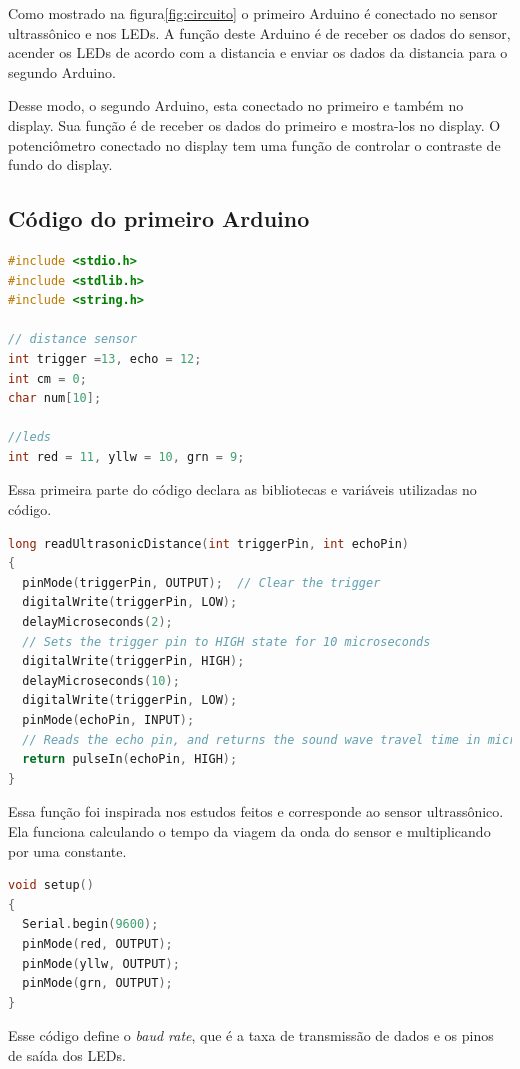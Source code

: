 \documentclass[conference]{IEEEtran}
\begin{document}
Como mostrado na figura\ref{fig:circuito} o primeiro Arduino é conectado no sensor ultrassônico e nos LEDs. A função deste Arduino é de receber os dados do sensor, acender os LEDs de acordo com a distancia e enviar os dados da distancia para o segundo Arduino.

Desse modo, o segundo Arduino, esta conectado no primeiro e também no display. Sua função é de receber os dados do primeiro e mostra-los no display. O potenciômetro conectado no display tem uma função de controlar o contraste de fundo do display.

\subsection{Código do primeiro Arduino}

\begin{lstlisting}[language=C]
#include <stdio.h>
#include <stdlib.h>
#include <string.h>

// distance sensor
int trigger =13, echo = 12;
int cm = 0;
char num[10];

//leds
int red = 11, yllw = 10, grn = 9; 
\end{lstlisting}

Essa primeira parte do código declara as bibliotecas e variáveis utilizadas no código.

\begin{lstlisting}[language=C]
long readUltrasonicDistance(int triggerPin, int echoPin)
{
  pinMode(triggerPin, OUTPUT);  // Clear the trigger
  digitalWrite(triggerPin, LOW);
  delayMicroseconds(2);
  // Sets the trigger pin to HIGH state for 10 microseconds
  digitalWrite(triggerPin, HIGH);
  delayMicroseconds(10);
  digitalWrite(triggerPin, LOW);
  pinMode(echoPin, INPUT);
  // Reads the echo pin, and returns the sound wave travel time in microseconds
  return pulseIn(echoPin, HIGH);
}
\end{lstlisting}

Essa função foi inspirada nos estudos feitos\cite{sensor:online} e corresponde ao sensor ultrassônico. Ela funciona calculando o tempo da viagem da onda do sensor e multiplicando por uma constante.

\begin{lstlisting}[language=C]
void setup()
{
  Serial.begin(9600);
  pinMode(red, OUTPUT);
  pinMode(yllw, OUTPUT);
  pinMode(grn, OUTPUT);
}
\end{lstlisting}

Esse código define o \textit{baud rate}, que é a taxa de transmissão de dados e os pinos de saída dos LEDs.
\end{document}
